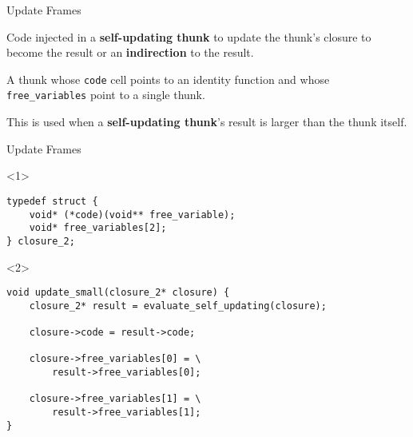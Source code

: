 \documentclass{beamer}
\begin{document}
\begin{frame}{Update Frames}
  \begin{definition}
    Code injected in a \textbf{self-updating thunk} to update the thunk's
    closure to become the result or an \textbf{indirection} to the result.
  \end{definition}

  \begin{definition}[Indirection]
    A thunk whose \texttt{code} cell points to an identity function and whose
    \texttt{free\_variables} point to a single thunk.

    This is used when a \textbf{self-updating thunk}'s result is larger than
    the thunk itself.
  \end{definition}
\end{frame}

\begin{frame}[fragile]{Update Frames}
  \begin{onlyenv}<1>
    \begin{verbatim}
typedef struct {
    void* (*code)(void** free_variable);
    void* free_variables[2];
} closure_2;

    \end{verbatim}
  \end{onlyenv}

  \begin{onlyenv}<2>
    \begin{verbatim}
void update_small(closure_2* closure) {
    closure_2* result = evaluate_self_updating(closure);

    closure->code = result->code;

    closure->free_variables[0] = \
        result->free_variables[0];

    closure->free_variables[1] = \
        result->free_variables[1];
}
    \end{verbatim}
  \end{onlyenv}
\end{frame}
\end{document}
